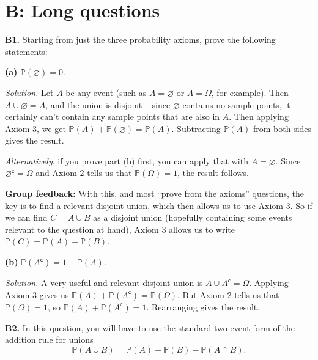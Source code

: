\documentclass[
  a4paper,
]{book}
\theoremstyle{definition}
\theoremstyle{definition}
\theoremstyle{definition}
\theoremstyle{definition}
\theoremstyle{remark}
\begin{document}
\hypertarget{P2-long}{%
\section*{B: Long questions}\label{P2-long}}

\textbf{B1.} Starting from just the three probability axioms, prove the following statements:

\textbf{(a)} \(\mathbb P(\varnothing) = 0\).

\begin{myanswers}
\emph{Solution.} Let \(A\) be any event (such as \(A = \varnothing\) or \(A = \Omega\), for example). Then \(A \cup \varnothing = A\), and the union is disjoint -- since \(\varnothing\) contains no sample points, it certainly can't contain any sample points that are also in \(A\). Then applying Axiom 3, we get \(\mathbb P(A) + \mathbb P(\varnothing) = \mathbb P(A)\). Subtracting \(\mathbb P(A)\) from both sides gives the result.

\emph{Alternatively}, if you prove part (b) first, you can apply that with \(A = \varnothing\). Since \(\varnothing^\mathsf{c}= \Omega\) and Axiom 2 tells us that \(\mathbb P(\Omega) = 1\), the result follows.

\textbf{Group feedback:} With this, and most ``prove from the axioms'' questions, the key is to find a relevant disjoint union, which then allows us to use Axiom 3. So if we can find \(C = A \cup B\) as a disjoint union (hopefully containing some events relevant to the question at hand), Axiom 3 allows us to write \(\mathbb P(C) = \mathbb P(A) + \mathbb P(B)\).

\end{myanswers}

\textbf{(b)} \(\mathbb P(A^\mathsf{c}) = 1 - \mathbb P(A)\).

\begin{myanswers}
\emph{Solution.} A very useful and relevant disjoint union is \(A \cup A^\mathsf{c}= \Omega\). Applying Axiom 3 gives us \(\mathbb P(A) + \mathbb P(A^\mathsf{c}) = \mathbb P(\Omega)\). But Axiom 2 tells us that \(\mathbb P(\Omega) = 1\), so \(\mathbb P(A) + \mathbb P(A^\mathsf{c}) = 1\). Rearranging gives the result.

\end{myanswers}

\textbf{B2.} In this question, you will have to use the standard two-event form of the addition rule for unions
\[ \mathbb P(A \cup B) = \mathbb P(A) + \mathbb P(B) - \mathbb P(A \cap B) . \]
\end{document}
